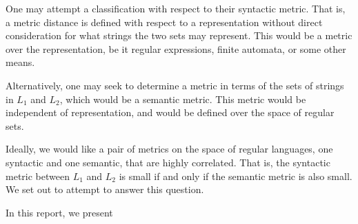 One may attempt a classification with respect to their syntactic metric.
That is, a metric distance is defined with respect to a representation
without direct consideration for what strings the two sets may represent.
This would be a metric over the representation, be it regular
expressions, finite automata, or some other means.


Alternatively, one may seek to determine a metric in terms of
the sets of strings in \(L_1\) and \(L_2\), which would be a semantic metric.
This metric would be independent of representation,
and would be defined over the space of regular sets.



Ideally, we would like a pair of metrics on the space of regular languages,
one syntactic and one semantic,
that are highly correlated.
That is, the syntactic metric between \(L_1\) and \(L_2\) is small
if and only if the semantic metric is also small.
We set out to attempt to answer this question.



In this report,
we present








